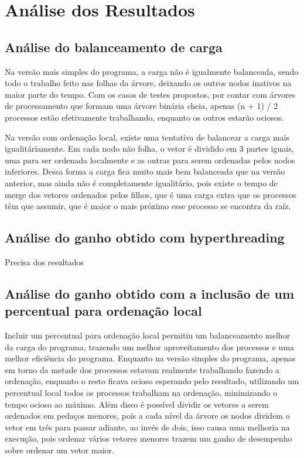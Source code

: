 \section{Análise dos Resultados}

\subsection{Análise do balanceamento de carga}

Na versão mais simples do programa, a carga não é igualmente balanceada, sendo todo o trabalho feito nas folhas da árvore, deixando os outros nodos inativos na maior parte do tempo. Com os casos de testes propostos, por contar com árvores de processamento que formam uma árvore binária cheia, apenas (n + 1) / 2 processos estão efetivamente trabalhando, enquanto os outros estarão ociosos.

Na versão com ordenação local, existe uma tentativa de balancear a carga mais igualitáriamente. Em cada nodo não folha, o vetor é dividido em 3 partes iguais, uma para ser ordenada localmente e as outras para serem ordenadas pelos nodos inferiores. Dessa forma a carga fica muito mais bem balanceada que na versão anterior, mas ainda não é completamente igualitário, pois existe o tempo de merge dos vetores ordenados pelos filhos, que é uma carga extra que os processos têm que assumir, que é maior o mais próximo esse processo se encontra da raíz.

\subsection{Análise do ganho obtido com hyperthreading}

Precisa dos resultados

\subsection{Análise do ganho obtido com a inclusão de um percentual para ordenação local}

Incluir um percentual para ordenação local permitiu um balanceamento melhor da carga do programa, trazendo um melhor aproveitamento dos processos e uma melhor eficiência do programa. Enquanto na versão simples do programa, apenas em torno da metade dos processos estavam realmente trabalhando fazendo a ordenação, enquanto o resto ficava ocioso esperando pelo resultado, utilizando um percentual local todos os processos trabalham na ordenação, minimizando o tempo ocioso ao máximo. Além disso é possível dividir os vetores a serem ordenados em pedaços menores, pois a cada nível da árvore os nodos dividem o vetor em três para passar adiante, ao invés de dois, isso causa uma melhoria na execução, pois ordenar vários vetores menores trazem um ganho de desempenho sobre ordenar um vetor maior.